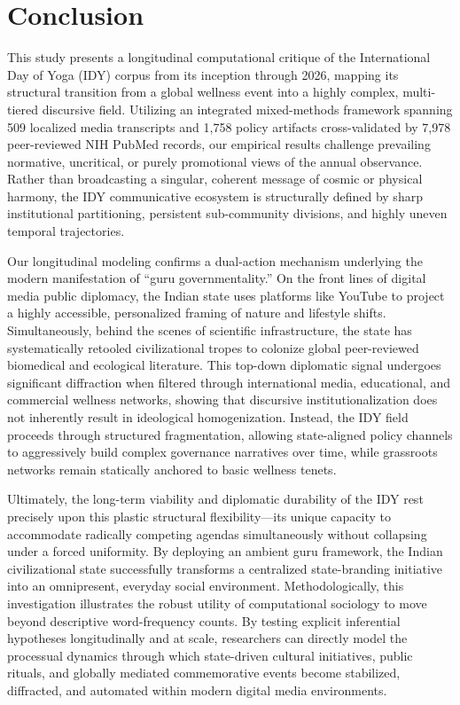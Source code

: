 \documentclass[11pt]{article}
\begin{document}
{\section{Conclusion}
This study presents a longitudinal computational critique of the International Day of Yoga (IDY) corpus from its inception through 2026, mapping its structural transition from a global wellness event into a highly complex, multi-tiered discursive field. Utilizing an integrated mixed-methods framework spanning 509 localized media transcripts and 1,758 policy artifacts cross-validated by 7,978 peer-reviewed NIH PubMed records, our empirical results challenge prevailing normative, uncritical, or purely promotional views of the annual observance. Rather than broadcasting a singular, coherent message of cosmic or physical harmony, the IDY communicative ecosystem is structurally defined by sharp institutional partitioning, persistent sub-community divisions, and highly uneven temporal trajectories.

Our longitudinal modeling confirms a dual-action mechanism underlying the modern manifestation of ``guru governmentality.'' On the front lines of digital media public diplomacy, the Indian state uses platforms like YouTube to project a highly accessible, personalized framing of nature and lifestyle shifts. Simultaneously, behind the scenes of scientific infrastructure, the state has systematically retooled civilizational tropes to colonize global peer-reviewed biomedical and ecological literature. This top-down diplomatic signal undergoes significant diffraction when filtered through international media, educational, and commercial wellness networks, showing that discursive institutionalization does not inherently result in ideological homogenization. Instead, the IDY field proceeds through structured fragmentation, allowing state-aligned policy channels to aggressively build complex governance narratives over time, while grassroots networks remain statically anchored to basic wellness tenets.

Ultimately, the long-term viability and diplomatic durability of the IDY rest precisely upon this plastic structural flexibility---its unique capacity to accommodate radically competing agendas simultaneously without collapsing under a forced uniformity. By deploying an ambient guru framework, the Indian civilizational state successfully transforms a centralized state-branding initiative into an omnipresent, everyday social environment. Methodologically, this investigation illustrates the robust utility of computational sociology to move beyond descriptive word-frequency counts. By testing explicit inferential hypotheses longitudinally and at scale, researchers can directly model the processual dynamics through which state-driven cultural initiatives, public rituals, and globally mediated commemorative events become stabilized, diffracted, and automated within modern digital media environments.


}
\end{document}
